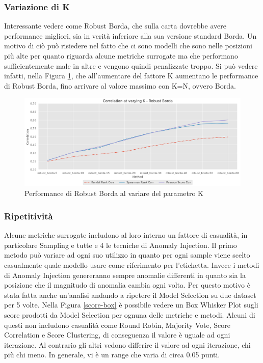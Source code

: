 \newpage
\subsubsection{Variazione di K}
Interessante vedere come Robust Borda, che sulla carta dovrebbe avere performance migliori, sia in verità inferiore alla sua versione standard Borda. Un motivo di ciò può risiedere nel fatto che ci sono modelli che sono nelle posizioni più alte per quanto riguarda alcune metriche surrogate ma che performano sufficientemente male in altre e vengono quindi penalizzate troppo.
Si può vedere infatti, nella Figura \ref{varying-k}, che all'aumentare del fattore K aumentano le performance di Robust Borda, fino arrivare al valore massimo con K=N, ovvero Borda.


\begin{figure}[t]
	\centering
	\includegraphics[width=14cm, scale=1]{images/varying-k}
	\caption{Performance di Robust Borda al variare del parametro K}
	\label{varying-k}
		
\end{figure}

\subsubsection{Ripetitività}
Alcune metriche surrogate includono al loro interno un fattore di casualità, in particolare Sampling e tutte e 4 le tecniche di Anomaly Injection. Il primo metodo può variare ad ogni suo utilizzo in quanto per ogni sample viene scelto casualmente quale modello usare come riferimento per l'etichetta. Invece i metodi di Anomaly Injection genereranno sempre anomalie differenti in quanto sia la posizione che il magnitudo di anomalia cambia ogni volta.
Per questo motivo è stata fatta anche un'analisi andando a ripetere il Model Selection su due dataset per 5 volte.
Nella Figura \ref{score-box} è possibile vedere un Box Whisker Plot sugli score prodotti da Model Selection per ognuna delle metriche e metodi. Alcuni di questi non includono casualità come Round Robin, Majority Vote, Score Correlation e Score Clustering, di conseguenza il valore è uguale ad ogni iterazione. Al contrario gli altri vedono differire il valore ad ogni iterazione, chi più chi meno. In generale, vi è un range che varia di circa 0.05 punti.

